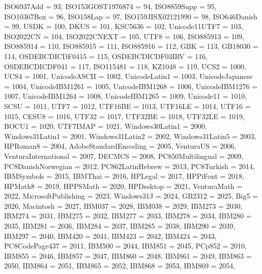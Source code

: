 \documentclass{wg21}
\begin{document}
\begin{addedblock}
\begin{codeblock}
{        ISO6937Add = 93,
        ISO153GOST1976874 = 94,
        ISO8859Supp = 95,
        ISO10367Box = 96,
        ISO158Lap = 97,
        ISO159JISX02121990 = 98,
        ISO646Danish = 99,
        USDK = 100,
        DKUS = 101,
        KSC5636 = 102,
        Unicode11UTF7 = 103,
        ISO2022CN = 104,
        ISO2022CNEXT = 105,
        UTF8 = 106,
        ISO885913 = 109,
        ISO885914 = 110,
        ISO885915 = 111,
        ISO885916 = 112,
        GBK = 113,
        GB18030 = 114,
        OSDEBCDICDF0415 = 115,
        OSDEBCDICDF03IRV = 116,
        OSDEBCDICDF041 = 117,
        ISO115481 = 118,
        KZ1048 = 119,
        UCS2 = 1000,
        UCS4 = 1001,
        UnicodeASCII = 1002,
        UnicodeLatin1 = 1003,
        UnicodeJapanese = 1004,
        UnicodeIBM1261 = 1005,
        UnicodeIBM1268 = 1006,
        UnicodeIBM1276 = 1007,
        UnicodeIBM1264 = 1008,
        UnicodeIBM1265 = 1009,
        Unicode11 = 1010,
        SCSU = 1011,
        UTF7 = 1012,
        UTF16BE = 1013,
        UTF16LE = 1014,
        UTF16 = 1015,
        CESU8 = 1016,
        UTF32 = 1017,
        UTF32BE = 1018,
        UTF32LE = 1019,
        BOCU1 = 1020,
        UTF7IMAP = 1021,
        Windows30Latin1 = 2000,
        Windows31Latin1 = 2001,
        Windows31Latin2 = 2002,
        Windows31Latin5 = 2003,
        HPRoman8 = 2004,
        AdobeStandardEncoding = 2005,
        VenturaUS = 2006,
        VenturaInternational = 2007,
        DECMCS = 2008,
        PC850Multilingual = 2009,
        PC8DanishNorwegian = 2012,
        PC862LatinHebrew = 2013,
        PC8Turkish = 2014,
        IBMSymbols = 2015,
        IBMThai = 2016,
        HPLegal = 2017,
        HPPiFont = 2018,
        HPMath8 = 2019,
        HPPSMath = 2020,
        HPDesktop = 2021,
        VenturaMath = 2022,
        MicrosoftPublishing = 2023,
        Windows31J = 2024,
        GB2312 = 2025,
        Big5 = 2026,
        Macintosh = 2027,
        IBM037 = 2028,
        IBM038 = 2029,
        IBM273 = 2030,
        IBM274 = 2031,
        IBM275 = 2032,
        IBM277 = 2033,
        IBM278 = 2034,
        IBM280 = 2035,
        IBM281 = 2036,
        IBM284 = 2037,
        IBM285 = 2038,
        IBM290 = 2039,
        IBM297 = 2040,
        IBM420 = 2041,
        IBM423 = 2042,
        IBM424 = 2043,
        PC8CodePage437 = 2011,
        IBM500 = 2044,
        IBM851 = 2045,
        PCp852 = 2010,
        IBM855 = 2046,
        IBM857 = 2047,
        IBM860 = 2048,
        IBM861 = 2049,
        IBM863 = 2050,
        IBM864 = 2051,
        IBM865 = 2052,
        IBM868 = 2053,
        IBM869 = 2054,
}
\end{codeblock}
\end{addedblock}
\end{document}
